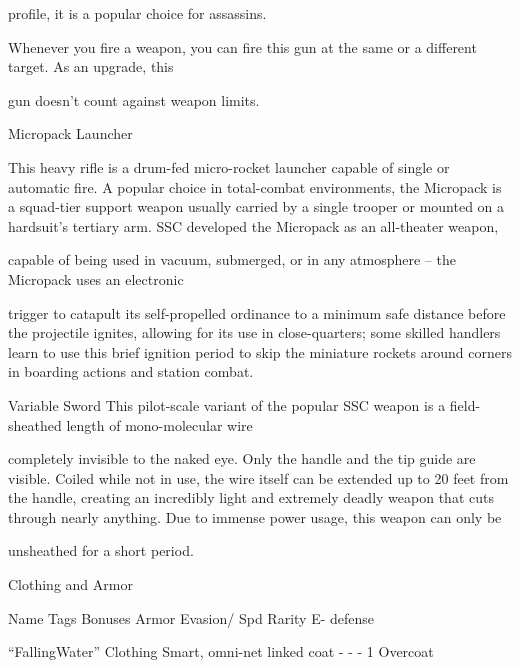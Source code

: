 profile, it is a popular choice for assassins.  

Whenever you fire a weapon, you can fire this gun at the same or a different target. As an upgrade, this  

gun doesn’t count against weapon limits.
 

Micropack Launcher  

This heavy rifle is a drum-fed micro-rocket launcher capable of single or automatic fire. A popular choice in  
total-combat environments, the Micropack is a squad-tier support weapon usually carried by a single  
trooper or mounted on a hardsuit’s tertiary arm. SSC developed the Micropack as an all-theater weapon,  

capable of being used in vacuum, submerged, or in any atmosphere -- the Micropack uses an electronic  

                                                                                                                      


trigger to catapult its self-propelled ordinance to a minimum safe distance before the projectile ignites,  
allowing for its use in close-quarters; some skilled handlers learn to use this brief ignition period to skip the  
miniature rockets around corners in boarding actions and station combat.   

Variable Sword  
This pilot-scale variant of the popular SSC weapon is a field-sheathed length of mono-molecular wire  

completely invisible to the naked eye. Only the handle and the tip guide are visible. Coiled while not in use,  
the wire itself can be extended up to 20 feet from the handle, creating an incredibly light and extremely  
deadly weapon that cuts through nearly anything. Due to immense power usage, this weapon can only be  

unsheathed for a short period.  

                                                  Clothing and Armor  

 Name                    Tags           Bonuses                                  Armor        Evasion/     Spd     Rarity 
                                                                                              E- 
                                                                                              defense 

  “FallingWater”          Clothing      Smart, omni-net linked coat              -            -            -       1 
 Overcoat 

